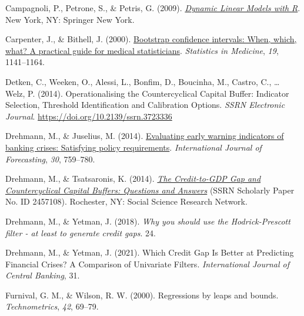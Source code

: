 \documentclass[
  12pt,
]{article}
\newlength{\cslhangindent}
\newlength{\cslentryspacingunit} %
\newenvironment{CSLReferences}[2] %
 {%
  \setlength{\parindent}{0pt}
  \ifodd #1
  \let\oldpar\par
  \def\par{\hangindent=\cslhangindent\oldpar}
  \fi
  \setlength{\parskip}{#2\cslentryspacingunit}
 }%
 {}
\begin{document}
\begin{CSLReferences}{1}{0}
\leavevmode{}%
Campagnoli, P., Petrone, S., \& Petris, G. (2009). \emph{\href{https://doi.org/10.1007/b135794}{Dynamic {Linear Models} with {R}}}. {New York, NY}: {Springer New York}.

\leavevmode{}%
Carpenter, J., \& Bithell, J. (2000). \href{https://doi.org/10.1002/(SICI)1097-0258(20000515)19:9\%3C1141::AID-SIM479\%3E3.0.CO;2-F}{Bootstrap confidence intervals: When, which, what? {A} practical guide for medical statisticians}. \emph{Statistics in Medicine}, \emph{19}, 1141--1164.

\leavevmode{}%
Detken, C., Weeken, O., Alessi, L., Bonfim, D., Boucinha, M., Castro, C., \ldots{} Welz, P. (2014). Operationalising the {Countercyclical Capital Buffer}: {Indicator Selection}, {Threshold Identification} and {Calibration Options}. \emph{SSRN Electronic Journal}. \url{https://doi.org/10.2139/ssrn.3723336}

\leavevmode{}%
Drehmann, M., \& Juselius, M. (2014). \href{https://doi.org/10.1016/j.ijforecast.2013.10.002}{Evaluating early warning indicators of banking crises: {Satisfying} policy requirements}. \emph{International Journal of Forecasting}, \emph{30}, 759--780.

\leavevmode{}%
Drehmann, M., \& Tsatsaronis, K. (2014). \emph{\href{https://papers.ssrn.com/abstract=2457108}{The {Credit-to-GDP Gap} and {Countercyclical Capital Buffers}: {Questions} and {Answers}}} (SSRN Scholarly Paper No. ID 2457108). {Rochester, NY}: {Social Science Research Network}.

\leavevmode{}%
Drehmann, M., \& Yetman, J. (2018). \emph{Why you should use the {Hodrick-Prescott} filter - at least to generate credit gaps}. 24.

\leavevmode{}%
Drehmann, M., \& Yetman, J. (2021). Which {Credit Gap Is Better} at {Predicting Financial Crises}? {A Comparison} of {Univariate Filters}. \emph{International Journal of Central Banking}, 31.

\leavevmode{}%
Furnival, G. M., \& Wilson, R. W. (2000). Regressions by leaps and bounds. \emph{Technometrics}, \emph{42}, 69--79.


\end{CSLReferences}
\end{document}
